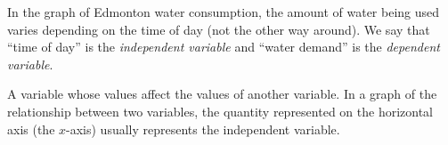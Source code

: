%
%

In the graph of Edmonton water consumption, the amount of water being used varies depending on the time of day (not the other way around). We say that ``time of day'' is the \textit{independent variable} and ``water demand'' is the \textit{dependent variable}. 

\begin{boxeddef}
A variable whose values affect the values of another variable. In a graph of the relationship between two variables, the quantity represented on the horizontal axis (the $x$-axis) usually represents the independent variable.
\end{boxeddef}

